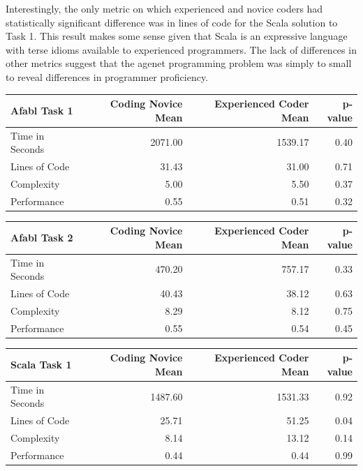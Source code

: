 Interestingly, the only metric on which experienced and novice coders had statistically significant difference was in lines of code for the Scala solution to Task 1. This result makes some sense given that Scala is an expressive language with terse idioms available to experienced programmers. The lack of differences in other metrics suggest that the agenet programming problem was simply to small to reveal differences in programmer proficiency.

\begin{center}
\begin{table}[h]
\begin{center}
\begin{tabular}{|l|r|r|r|}\hline
Afabl Task 1 & Coding Novice Mean & Experienced Coder Mean & p-value \\\hline
Time in Seconds & 2071.00 & 1539.17 & 0.40\\
Lines of Code & 31.43 & 31.00 & 0.71\\
Complexity & 5.00 & 5.50 & 0.37\\
Performance & 0.55 & 0.51 & 0.32\\
\hline
\end{tabular}


\begin{tabular}{|l|r|r|r|}\hline
Afabl Task 2 & Coding Novice Mean & Experienced Coder Mean & p-value \\\hline
Time in Seconds & 470.20 & 757.17 & 0.33\\
Lines of Code & 40.43 & 38.12 & 0.63\\
Complexity & 8.29 & 8.12 & 0.75\\
Performance & 0.55 & 0.54 & 0.45\\
\hline
\end{tabular}


\begin{tabular}{|l|r|r|r|}\hline
Scala Task 1 & Coding Novice Mean & Experienced Coder Mean & p-value \\\hline
Time in Seconds & 1487.60 & 1531.33 & 0.92\\
Lines of Code & 25.71 & 51.25 & 0.04\\
Complexity & 8.14 & 13.12 & 0.14\\
Performance & 0.44 & 0.44 & 0.99\\
\hline
\end{tabular}



\end{center}
\end{table}
\end{center}
